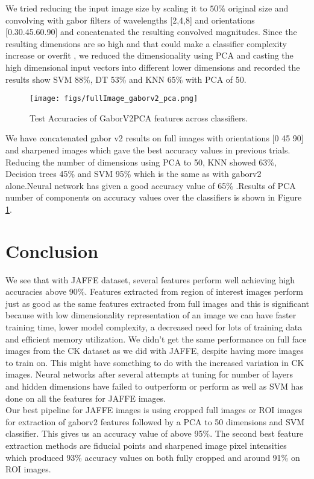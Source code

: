\documentclass[10pt,twocolumn,letterpaper]{article}
\begin{document}
\par
We tried reducing the input image size by scaling it to $50\%$ original size and convolving with gabor filters of wavelengths [2,4,8] and orientations [0.30.45.60.90] and concatenated the resulting convolved magnitudes. Since the resulting dimensions are so high and that could make a classifier complexity increase or overfit , we reduced the dimensionality using PCA and casting the high dimensional input vectors into different lower dimensions and recorded the results show SVM 88\%, DT 53\% and KNN 65\% with PCA of 50.

\begin{figure}[h]
\centerline{\texttt{[image: figs/fullImage\_gaborv2\_pca.png]}}
\caption{Test Accuracies of GaborV2PCA features across classifiers.}
\label{fig:testacc5}
\end{figure}

We have concatenated gabor v2 results on full images with orientations [0 45 90] and sharpened images which gave the best accuracy values in previous trials. Reducing the number of dimensions using PCA to 50, KNN showed 63\%, Decision trees 45\% and SVM 95\% which is the same as with gaborv2 alone.Neural network has given a good accuracy value of 65\% .Results of PCA number of components on accuracy values over the classifiers is shown in Figure \ref{fig:testacc5}.

\section{Conclusion}
We see that with JAFFE dataset, several features perform well achieving high accuracies above 90\%. Features extracted from region of interest images perform just as good as the same features extracted from full images and this is significant because with low dimensionality representation of an image we can have faster training time, lower model complexity, a decreased need for lots of training data and efficient memory utilization. We didn't get the same performance on full face images from the CK dataset as we did with JAFFE, despite having more images to train on. This might have something to do with the increased variation in CK images. Neural networks after several attempts at tuning for number of layers and hidden dimensions have failed to outperform or perform as well as SVM has done on all the features for JAFFE images. \\

Our best pipeline for JAFFE images is using cropped full images or ROI images for extraction of gaborv2 features followed by a PCA to 50 dimensions and SVM classifier. This gives us an accuracy value of above 95\%. The second best feature extraction methods are fiducial points and sharpened image pixel intensities which produced 93\% accuracy values on both fully cropped and around 91\% on ROI images. 
\end{document}
